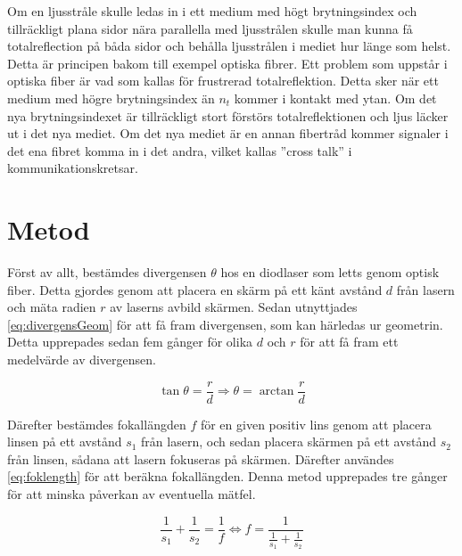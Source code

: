 \documentclass[a4paper]{article}
\begin{document}
	Om en ljusstråle skulle ledas in i ett medium med högt brytningsindex och tillräckligt plana sidor nära parallella med ljusstrålen skulle man kunna få totalreflection på båda sidor och behålla ljusstrålen i mediet hur länge som helst. Detta är principen bakom till exempel optiska fibrer. Ett problem som uppstår i optiska fiber är vad som kallas för frustrerad totalreflektion. Detta sker när ett medium med högre brytningsindex än $n_t$ kommer i kontakt med ytan. Om det nya brytningsindexet är tillräckligt stort förstörs totalreflektionen och ljus läcker ut i det nya mediet. Om det nya mediet är en annan fibertråd kommer signaler i det ena fibret komma in i det andra, vilket kallas ”cross talk” i kommunikationskretsar.
	\cite[pp.~261--263]{pearsonIntroOpt}

\section{Metod}
  

Först av allt, bestämdes divergensen $\theta$ hos en diodlaser som letts genom optisk fiber. Detta gjordes genom att placera en skärm på ett känt avstånd $d$ från lasern och mäta radien $r$ av laserns avbild skärmen. Sedan utnyttjades \eqref{eq:divergensGeom} för att få fram divergensen, som kan härledas ur geometrin. Detta upprepades sedan fem gånger för olika $d$ och $r$ för att få fram ett medelvärde av divergensen.

 \begin{equation}
\tan\theta = \frac{r}{d} \Rightarrow \theta = \arctan\frac{r}{d}\label{eq:divergensGeom}
\end{equation}


Därefter bestämdes fokallängden $f$ för en given positiv lins genom att placera linsen på ett avstånd $s_1$ från lasern, och sedan placera skärmen på ett avstånd $s_2$ från linsen, sådana att lasern fokuseras på skärmen. Därefter användes \eqref{eq:foklength} för att beräkna fokallängden. Denna metod upprepades tre gånger för att minska påverkan av eventuella mätfel.

\begin{equation}
	\frac{1}{s_1} + \frac{1}{s_2} = \frac{1}{f} \iff f = \frac{1}{\frac{1}{s_1} + \frac{1}{s_2}}\label{eq:foklength}
\end{equation}
\end{document}
